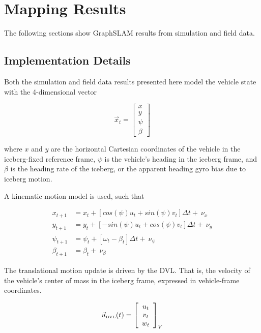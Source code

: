 
\chapter{Mapping Results}
\label{ch.Results}

The following sections show GraphSLAM results from simulation and field data. 

\section{Implementation Details}

Both the simulation and field data results presented here model the vehicle state with the 4-dimensional vector

\begin{equation}
\vec{x}_t = \left[\begin{array}{c}
                     x \\ y \\ \psi \\ \beta 
                     \end{array}\right]
\end{equation}

where $x$ and $y$ are the horizontal Cartesian coordinates of the vehicle in the iceberg-fixed reference frame, $\psi$ is the vehicle's heading in the iceberg frame, and $\beta$ is the heading rate of the iceberg, or the apparent heading gyro bias due to iceberg motion. 

A kinematic motion model is used, such that

\begin{align}
x_{t+1} &= x_t + \left[cos(\psi) u_t + sin(\psi)v_t\right]\Delta t +~ \nu_x\\
y_{t+1} &= y_t + \left[-sin(\psi) u_t + cos(\psi)v_t\right]\Delta t + ~\nu_y \\
\psi_{t+1}    &= \psi_{t} + \left[\omega_t- \beta_t \right] \Delta t + ~\nu_\psi\\
\beta_{t +1}   &= \beta_{t} + ~\nu_\beta
\end{align}

The translational motion update is driven by the DVL. That is, the velocity of the vehicle's center of mass in the iceberg frame, expressed in vehicle-frame coordinates. 

\begin{equation}
\vec{u}_\text{\tiny{DVL}}(t) = 
                    \left[\begin{array}{c}
                     u_t \\ v_t \\ w_t 
                     \end{array}\right]_V
\end{equation}

